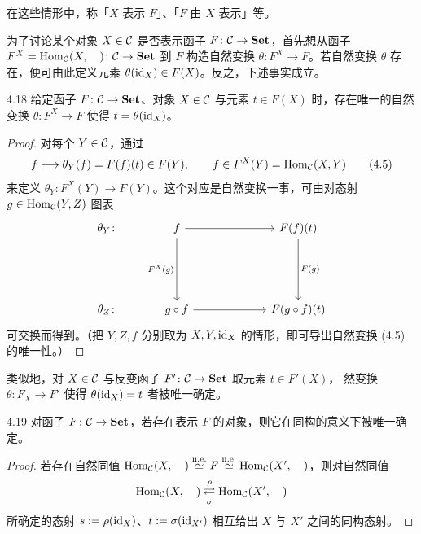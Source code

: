 在这些情形中，称「$X$ 表示 $F$」、「$F$ 由 $X$ 表示」等。

为了讨论某个对象 $X\in\mathcal{C}$ 是否表示函子 $F\colon\mathcal{C}\to\mathbf{Set}$，首先想从函子 $F^X=\operatorname{Hom}_{\mathcal{C}}(X,\quad)\colon\mathcal{C}\to\mathbf{Set}$ 到 $F$ 构造自然变换 $\theta\colon F^X\to F$。若自然变换 $\theta$ 存在，便可由此定义元素 $\theta(\mathrm{id}_X)\in F(X)$。反之，下述事实成立。

\begin{lemma}{4.18}
给定函子 $F\colon\mathcal{C}\to\mathbf{Set}$、对象 $X\in\mathcal{C}$ 与元素 $t\in F(X)$ 时，存在唯一的自然变换 $\theta\colon F^X\to F$ 使得 $t=\theta(\mathrm{id}_X)$。
\end{lemma}

\begin{proof}
对每个 $Y\in\mathcal{C}$，通过
\begin{equation}
  f\longmapsto\theta_Y(f)=F(f)(t)\in F(Y),\qquad f\in F^X(Y)=\operatorname{Hom}_{\mathcal{C}}(X,Y) \tag{4.5}
\end{equation}
来定义 $\theta_Y\colon F^X(Y)\to F(Y)$。这个对应是自然变换一事，可由对态射 $g\in\operatorname{Hom}_{\mathcal{C}}(Y,Z)$ 图表
\[
\begin{tikzcd}[row sep=large, column sep=3.2em]
  \theta_Y\colon & f \arrow[rr] \arrow[dd,"F^X(g)"'] & & F(f)(t) \arrow[dd,"F(g)"] \\
  & & & \\
  \theta_Z\colon & g\circ f \arrow[rr] & & F(g\circ f)(t)
\end{tikzcd}
\]
可交换而得到。（把 $Y,Z,f$ 分别取为 $X,Y,\mathrm{id}_X$ 的情形，即可导出自然变换 (4.5) 的唯一性。）
\end{proof}

类似地，对 $X\in\mathcal{C}$ 与反变函子 $F'\colon\mathcal{C}\to\mathbf{Set}$ 取元素 $t\in F'(X)$，
然变换 $\theta\colon F_X\to F'$ 使得 $\theta(\mathrm{id}_X)=t$ 者被唯一确定。

\begin{corollary}{4.19}
对函子 $F\colon\mathcal{C}\to\mathbf{Set}$，若存在表示 $F$ 的对象，则它在同构的意义下被唯一确定。
\end{corollary}

\begin{proof}
若存在自然同值 $\operatorname{Hom}_{\mathcal{C}}(X,\quad)\overset{\mathrm{n.e.}}{\simeq}F\overset{\mathrm{n.e.}}{\simeq}\operatorname{Hom}_{\mathcal{C}}(X',\quad)$，则对自然同值
\[ \operatorname{Hom}_{\mathcal{C}}(X,\quad)\overset{\rho}{\underset{\sigma}{\rightleftarrows}}\operatorname{Hom}_{\mathcal{C}}(X',\quad) \]
所确定的态射 $s:=\rho(\mathrm{id}_X)$、$t:=\sigma(\mathrm{id}_{X'})$ 相互给出 $X$ 与 $X'$ 之间的同构态射。
\end{proof}

